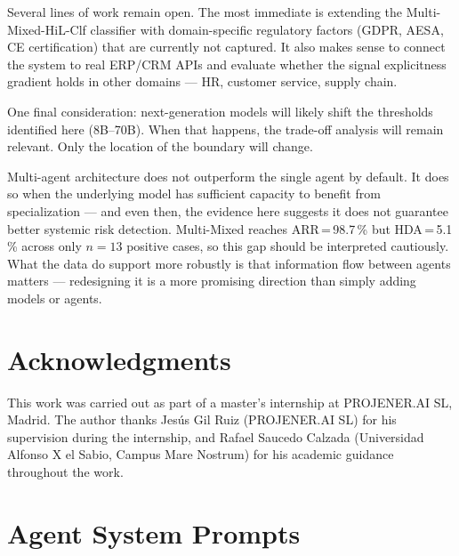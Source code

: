 \documentclass[preprint,12pt,numrefs]{elsarticle}
\begin{document}
Several lines of work remain open. The most immediate is extending the
Multi-Mixed-HiL-Clf classifier with domain-specific regulatory factors
(GDPR, AESA, CE certification) that are currently not captured. It also
makes sense to connect the system to real ERP/CRM APIs and evaluate
whether the signal explicitness gradient holds in other domains --- HR,
customer service, supply chain.

One final consideration: next-generation models \citep{OpenAI2023gpt4}
will likely shift the thresholds identified here (8B--70B). When that
happens, the trade-off analysis will remain relevant. Only the location
of the boundary will change.

Multi-agent architecture does not outperform the single agent by 
default. It does so when the underlying model has sufficient 
capacity to benefit from specialization --- and even then, 
the evidence here suggests it does not guarantee better 
systemic risk detection. Multi-Mixed reaches ARR\,=\,98.7\,\% 
but HDA\,=\,5.1\,\% across only $n=13$ positive cases, 
so this gap should be interpreted cautiously. What the data 
do support more robustly is that information flow between 
agents matters --- redesigning it is a more promising 
direction than simply adding models or agents.

\section*{Acknowledgments}

This work was carried out as part of a master's internship at
PROJENER.AI SL, Madrid. The author thanks Jesús Gil Ruiz (PROJENER.AI
SL) for his supervision during the internship, and Rafael Saucedo
Calzada (Universidad Alfonso X el Sabio, Campus Mare Nostrum) for his
academic guidance throughout the work.



\appendix
\section{Agent System Prompts}
\label{app:prompts}
\lstset{
  basicstyle=\ttfamily\footnotesize,
  breaklines=true,
  breakatwhitespace=false,
  breakindent=0pt,
  linewidth=\linewidth,
  columns=flexible
}
\end{document}
